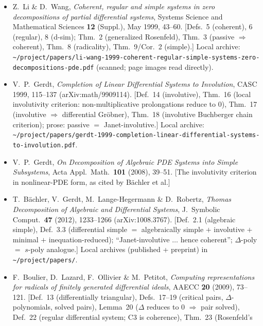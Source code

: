 \documentclass[11pt]{article}
\begin{document}
\begin{itemize}
  \item Z.~Li \& D.~Wang, \emph{Coherent, regular and simple systems in zero
        decompositions of partial differential systems}, Systems Science and
        Mathematical Sciences \textbf{12} (Suppl.), May 1999, 43--60.
        [Defs.~5 (coherent), 6 (regular), 8 (d-sim); Thm.~2 (generalized
        Rosenfeld), Thm.~3 (passive $\Rightarrow$ coherent), Thm.~8 (radicality),
        Thm.~9/Cor.~2 (simple).] Local archive:
        \nolinkurl{~/project/papers/li-wang-1999-coherent-regular-simple-systems-zero-decompositions-pde.pdf}
        (scanned; page images read directly).
  \item V.~P.~Gerdt, \emph{Completion of Linear Differential Systems to
        Involution}, CASC 1999, 115--137 (arXiv:math/9909114). [Def.~14
        (involutive), Thm.~16 (local involutivity criterion: non-multiplicative
        prolongations reduce to $0$), Thm.~17 (involutive $\Rightarrow$
        differential Gr\"obner), Thm.~18 (involutive Buchberger chain criterion);
        prose: passive $=$ Janet-involutive.] Local archive:
        \nolinkurl{~/project/papers/gerdt-1999-completion-linear-differential-systems-to-involution.pdf}.
  \item V.~P.~Gerdt, \emph{On Decomposition of Algebraic PDE Systems into Simple
        Subsystems}, Acta Appl.\ Math.\ \textbf{101} (2008), 39--51. [The
        involutivity criterion in nonlinear-PDE form, as cited by B\"achler et
        al.]
  \item T.~B\"achler, V.~Gerdt, M.~Lange-Hegermann \& D.~Robertz, \emph{Thomas
        Decomposition of Algebraic and Differential Systems}, J.~Symbolic
        Comput.\ \textbf{47} (2012), 1233--1266 (arXiv:1008.3767). [Def.~2.1
        (algebraic simple), Def.~3.3 (differential simple $=$ algebraically
        simple $+$ involutive $+$ minimal $+$ inequation-reduced); ``Janet-involutive
        $\dots$ hence coherent''; $\Delta$-poly $=$ $s$-poly analogue.] Local
        archives (published + preprint) in \nolinkurl{~/project/papers/}.
  \item F.~Boulier, D.~Lazard, F.~Ollivier \& M.~Petitot, \emph{Computing
        representations for radicals of finitely generated differential ideals},
        AAECC \textbf{20} (2009), 73--121. [Def.~13 (differentially triangular),
        Defs.~17--19 (critical pairs, $\Delta$-polynomials, solved pairs),
        Lemma~20 ($\Delta$ reduces to $0$ $\Rightarrow$ pair solved), Def.~22
        (regular differential system; C3 is coherence), Thm.~23 (Rosenfeld's

\end{itemize}
\end{document}
